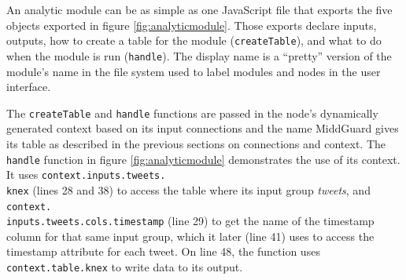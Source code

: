 \documentclass[midd]{thesis}
\begin{document}
An analytic module can be as simple as one JavaScript file that exports the five
objects exported in figure \ref{fig:analyticmodule}. Those exports declare
inputs, outputs, how to create a table for the module (\texttt{createTable}),
and what to do when the module is run (\texttt{handle}). The display name is a
``pretty'' version of the module's name in the file system used to label modules
and nodes in the user interface.

The \texttt{createTable} and \texttt{handle} functions are passed in the node's
dynamically generated context based on its input connections and the name
MiddGuard gives its table as described in the previous sections on connections
and context. The \texttt{handle} function in figure \ref{fig:analyticmodule}
demonstrates the use of its context. It uses
\texttt{context.inputs.tweets.\\knex} (lines 28 and 38) to access the table where
its input group \textit{tweets}, and
\texttt{context.\\inputs.tweets.cols.timestamp} (line 29) to get the name of the
timestamp column for that same input group, which it later (line 41) uses to
access the timestamp attribute for each tweet. On line 48, the function uses
\texttt{context.table.knex} to write data to its output.
\end{document}
